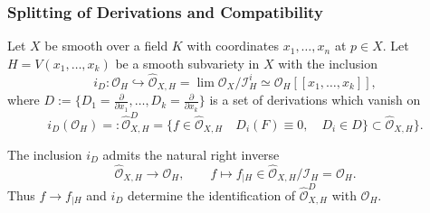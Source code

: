\documentclass{amsart}
\newcommand{\cI}{{\mathcal I}}
\newcommand{\cO}{{\mathcal O}}
\begin{document}
\subsubsection{Splitting of Derivations and Compatibility}




\begin{lemma}
Let $X$ be smooth over a field $K$ with coordinates $x_1,\ldots,x_n$ at $p \in X$. Let  $H = V(x_1,\ldots,x_k)$ be a smooth subvariety   in  $X$ with the inclusion $$i_D: \cO_H\hookrightarrow \widehat{\cO}_{X,H}=\lim \cO_X/\cI^i_H \simeq \cO_H[[x_1,\ldots,x_k]],$$ where $D:=\{D_1=\frac{\partial}{\partial x_1},\ldots,D_k=\frac{\partial}{\partial x_k}\}$  is a set of derivations
 which vanish on $$i_D(\cO_H)=: \widehat{\cO}_{X,H}^D=\{f\in \widehat{\cO}_{X,H} \quad D_i(F)\equiv 0, \quad D_i\in D \}\subset \widehat{\cO}_{X,H}\}.$$ 
 
 The  inclusion $i_D$ admits the natural right inverse $$\widehat{\cO}_{X,H}\to \cO_H, \quad \quad f\mapsto f_{|H}\in \widehat{\cO}_{X,H}/\cI_H=\cO_H.$$
Thus $f\to f_{|H}$ and $i_D$ determine  the identification of $\widehat{\cO}_{X,H}^D$ with $\cO_H$.
\end{lemma}
\end{document}
